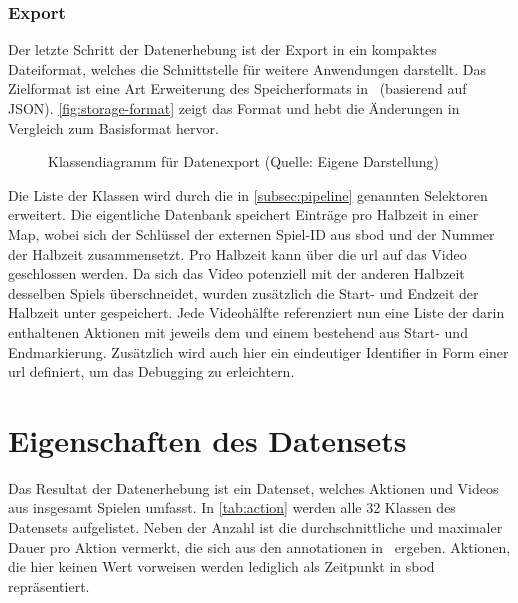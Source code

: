 \subsubsection{Export}

Der letzte Schritt der Datenerhebung ist der Export in ein kompaktes Dateiformat, welches die Schnittstelle für weitere Anwendungen darstellt.
Das Zielformat ist eine Art Erweiterung des Speicherformats in~\cite{Caba15} (basierend auf JSON).
\autoref{fig:storage-format} zeigt das Format und hebt die Änderungen in Vergleich zum Basisformat hervor.

\begin{figure}
    \centering
    \caption[Klassendiagramm für Datenexport]{Klassendiagramm für Datenexport (Quelle: Eigene Darstellung)}
    \label{fig:storage-format}
\end{figure}

Die Liste der Klassen wird durch die in \autoref{subsec:pipeline} genannten Selektoren erweitert.
Die eigentliche Datenbank speichert Einträge pro Halbzeit in einer Map, wobei sich der Schlüssel der externen Spiel-ID aus \gls{sbod} und der Nummer der Halbzeit zusammensetzt.
Pro Halbzeit kann über die \gls{url} auf das Video geschlossen werden.
Da sich das Video potenziell mit der anderen Halbzeit desselben Spiels überschneidet, wurden zusätzlich die Start- und Endzeit der Halbzeit unter  gespeichert.
Jede Videohälfte referenziert nun eine Liste der darin enthaltenen Aktionen mit jeweils dem  und einem  bestehend aus Start- und Endmarkierung.
Zusätzlich wird auch hier ein eindeutiger Identifier in Form einer \gls{url} definiert, um das Debugging zu erleichtern.

\section{Eigenschaften des Datensets}
\label{sec:eigenschaften-des-datensets}

Das Resultat der Datenerhebung ist ein Datenset, welches \noaction Aktionen und \novideos Videos aus insgesamt \nomatches Spielen umfasst.
In \autoref{tab:action} werden alle 32 Klassen des Datensets aufgelistet.
Neben der Anzahl ist die durchschnittliche und maximaler Dauer pro Aktion vermerkt, die sich aus den \gls{annotationen} in~\cite{Statsbomb20} ergeben.
Aktionen, die hier keinen Wert vorweisen werden lediglich als Zeitpunkt in \gls{sbod} repräsentiert.


